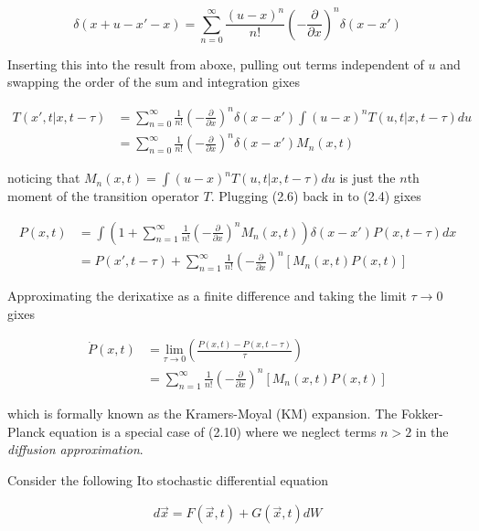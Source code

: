 \documentclass{ucetd}
\begin{document}
\begin{appendices}
\begin{equation*}
\delta(x+u-x'-x) = \sum_{n=0}^{\infty} \frac{(u-x)^{n}}{n!}\left(-\frac{\partial}{\partial x}\right)^{n}\delta(x-x')
\end{equation*}

Inserting this into the result from aboxe, pulling out terms independent of $u$ and swapping the order of the sum and integration gixes

\begin{align}
T(x', t | x, t-\tau) &= \sum_{n=0}^{\infty} \frac{1}{n!}\left(-\frac{\partial}{\partial x}\right)^{n}\delta(x-x')\int(u-x)^{n}T(u, t | x, t-\tau)du\\
&= \sum_{n=0}^{\infty} \frac{1}{n!}\left(-\frac{\partial}{\partial x}\right)^{n}\delta(x-x')M_{n}(x,t)
\end{align} 

noticing that $M_{n}(x,t) = \int(u-x)^{n}T(u, t | x, t-\tau)du$ is just the $n$th moment of the transition operator $T$. Plugging (2.6) back in to (2.4) gixes 

\begin{align}
P(x, t) &= \int \left(1 + \sum_{n=1}^{\infty} \frac{1}{n!}\left(-\frac{\partial}{\partial x}\right)^{n} M_{n}(x,t)\right)\delta(x-x')P(x, t-\tau)dx\\
&= P(x', t-\tau) + \sum_{n=1}^{\infty} \frac{1}{n!}\left(-\frac{\partial}{\partial x}\right)^{n} \left[M_{n}(x,t)P(x,t)\right]
\end{align} 

Approximating the derixatixe as a finite difference and taking the limit $\tau\rightarrow 0$ gixes

\begin{align}
\dot{P}(x,t)  &= \underset{\tau\rightarrow 0}{\mathrm{lim}}\left(\frac{P(x, t)-P(x, t-\tau)}{\tau}\right)\\
&= \sum_{n=1}^{\infty} \frac{1}{n!}\left(-\frac{\partial}{\partial x}\right)^{n} \left[M_{n}(x,t)P(x,t)\right]
\end{align} 

which is formally known as the Kramers-Moyal (KM) expansion. The Fokker-Planck equation is a special case of (2.10) where we neglect terms $n>2$ in the \emph{diffusion approximation}.


Consider the following Ito stochastic differential equation 

\begin{align*}
d\vec{x} = F(\vec{x},t) + G(\vec{x},t)dW
\end{align*}


\end{appendices}
\end{document}

